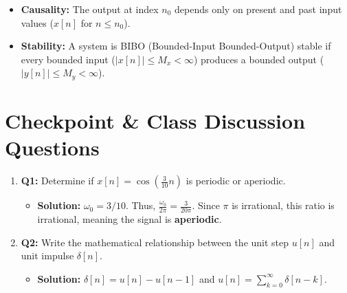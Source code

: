 \documentclass[11pt,a4paper]{article}
\begin{document}
\begin{itemize}
    \item \textbf{Causality:} The output at index $n_0$ depends only on present and past input values ($x[n]$ for $n \le n_0$).
    
    \item \textbf{Stability:} A system is BIBO (Bounded-Input Bounded-Output) stable if every bounded input ($|x[n]| \le M_x < \infty$) produces a bounded output ($|y[n]| \le M_y < \infty$).
\end{itemize}

\section{Checkpoint \& Class Discussion Questions}
\begin{enumerate}
    \item \textbf{Q1:} Determine if $x[n] = \cos(\frac{3}{10} n)$ is periodic or aperiodic.
    \begin{itemize}
        \item \textbf{Solution:} $\omega_0 = 3/10$. Thus, $\frac{\omega_0}{2\pi} = \frac{3}{20\pi}$. Since $\pi$ is irrational, this ratio is irrational, meaning the signal is \textbf{aperiodic}.
    \end{itemize}
    \item \textbf{Q2:} Write the mathematical relationship between the unit step $u[n]$ and unit impulse $\delta[n]$.
    \begin{itemize}
        \item \textbf{Solution:} $\delta[n] = u[n] - u[n-1]$ and $u[n] = \sum_{k=0}^{\infty} \delta[n-k]$.
    \end{itemize}
\end{enumerate}
\end{document}
